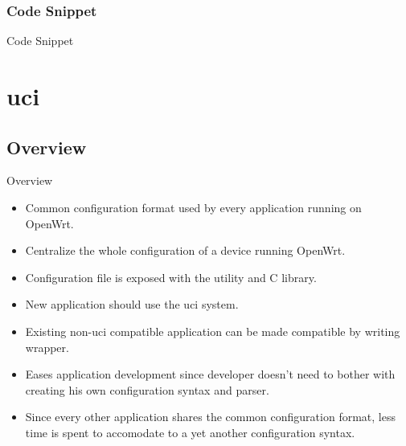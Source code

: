 \subsubsection{Code Snippet}
\begin{frame}{Code Snippet}
    
\end{frame}

\section{uci}

\subsection{Overview}
\begin{frame}{Overview}
    \begin{itemize}[<+-|alert@+>]
        \item Common configuration format used by every application running on OpenWrt.
        \item Centralize the whole configuration of a device running OpenWrt.
        \item Configuration file is exposed with the  utility and  C library.
        \item New application should use the uci system.
        \item Existing non-uci compatible application can be made compatible by writing wrapper.
        \item Eases application development since developer doesn't need to bother with creating his own configuration syntax and parser.
        \item Since every other application shares the common configuration format, less time is spent to accomodate to a yet another configuration syntax.
    \end{itemize}
\end{frame}

